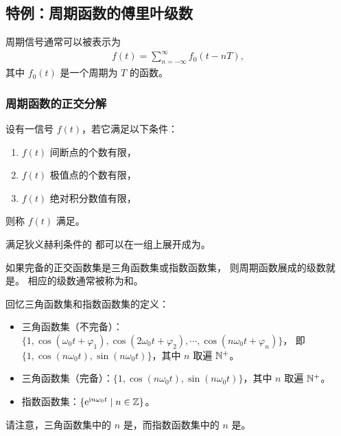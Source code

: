 \subsection{特例：周期函数的傅里叶级数}

\begin{remark}
    周期信号通常可以被表示为
    \begin{align*}
        f(t) = \sum_{n = -\infty}^{\infty} f_0(t - nT),
    \end{align*}
    其中 $f_0(t)$ 是一个周期为 $T$ 的函数。
\end{remark}

\subsubsection{周期函数的正交分解}

\begin{definition}[狄义赫利条件]
    设有一信号 $f(t)$，若它满足以下条件：
    \begin{enumerate}[label=(\arabic*)]
        \item $f(t)$ 间断点的个数有限，
        \item $f(t)$ 极值点的个数有限，
        \item $f(t)$ 绝对积分数值有限，
    \end{enumerate}
    则称 $f(t)$ 满足。
\end{definition}

\begin{theorem}
    满足狄义赫利条件的
    都可以在一组上展开成为。
\end{theorem}

\begin{definition}[傅里叶级数展开]
    如果完备的正交函数集是三角函数集或指数函数集，
    则周期函数展成的级数就是。
    相应的级数通常被称为和。
\end{definition}

\begin{note}
    回忆三角函数集和指数函数集的定义：
    \begin{itemize}
        \item 三角函数集（不完备）：$\{1, \cos(\omega_0t + \varphi_1), \cos(2\omega_0t + \varphi_2), \cdots, \cos(n\omega_0 t + \varphi_n)\}$，
            即 $\{1, \cos(n\omega_0t), \sin(n\omega_0t)\}$，其中 $n$ 取遍 $\mathbb{N}^{+}$。
        \item 三角函数集（完备）：$\{1, \cos(n\omega_0 t), \sin(n\omega_0 t)\}$，其中 $n$ 取遍 $\mathbb{N}^{+}$。
        \item 指数函数集：$\{\mathrm{e}^{\mathrm{i} n\omega_0t} \mid n \in \mathbb{Z}\}$。
    \end{itemize}
    请注意，三角函数集中的 $n$ 是，而指数函数集中的 $n$ 是。
\end{note}

